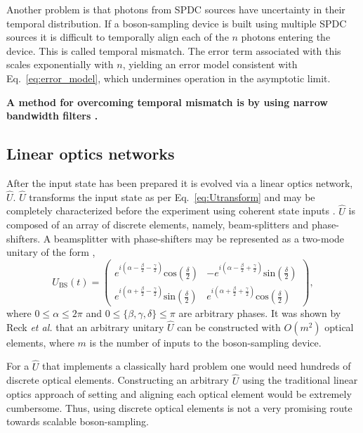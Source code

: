 \documentclass[aps,pra,twocolumn,amsmath,amssymb,nofootinbib,superscriptaddress]{revtex4}
\begin{document}
Another problem is that photons from SPDC sources have uncertainty in their temporal distribution. If a boson-sampling device is built using multiple SPDC sources it is difficult to temporally align each of the $n$ photons entering the device. This is called temporal mismatch. The error term associated with this scales exponentially with $n$, yielding an error model consistent with Eq.~\ref{eq:error_model}, which undermines operation in the asymptotic limit. 

\textbf{A method for overcoming temporal mismatch is by using narrow bandwidth filters \cite{}. }

\subsection{Linear optics networks}

After the input state has been prepared it is evolved via a linear optics network, $\hat{U}$. $\hat{U}$ transforms the input state as per Eq.~\ref{eq:Utransform} and may be completely characterized before the experiment using coherent state inputs \cite{bib:PhysRevLett.73.58}. $\hat{U}$ is composed of an array of discrete elements, namely, beam-splitters and phase-shifters. A beamsplitter with phase-shifters may be represented as a two-mode unitary of the form \cite{bib:GerryKnight05},
\begin{equation} \label{eq:BS}
U_{\mathrm{BS}}(t) = \left( \begin{array}{cc}
e^{i(\alpha-\frac{\beta}{2}-\frac{\gamma}{2})}\mathrm{cos}\left(\frac{\delta}{2}\right) & -e^{i(\alpha-\frac{\beta}{2}+\frac{\gamma}{2})}\mathrm{sin}\left(\frac{\delta}{2}\right)  \\
e^{i(\alpha+\frac{\beta}{2}-\frac{\gamma}{2})}\mathrm{sin}\left(\frac{\delta}{2}\right) & e^{i(\alpha+\frac{\beta}{2}+\frac{\gamma}{2})}\mathrm{cos}\left(\frac{\delta}{2}\right)
\end{array} \right), 
\end{equation}
where \mbox{$0\leq\alpha\leq2\pi$} and \mbox{$0\leq\{\beta,\gamma,\delta\}\leq\pi$} are arbitrary phases. It was shown by Reck \emph{et al.} \cite{bib:Reck94} that an arbitrary unitary $\hat{U}$ can be constructed with $O(m^2)$ optical elements, where $m$ is the number of inputs to the boson-sampling device.

For a $\hat{U}$ that implements a classically hard problem one would need hundreds of discrete optical elements. Constructing an arbitrary $\hat{U}$ using the traditional linear optics approach of setting and aligning each optical element would be extremely cumbersome. Thus, using discrete optical elements is not a very promising route towards scalable boson-sampling.
\end{document}
